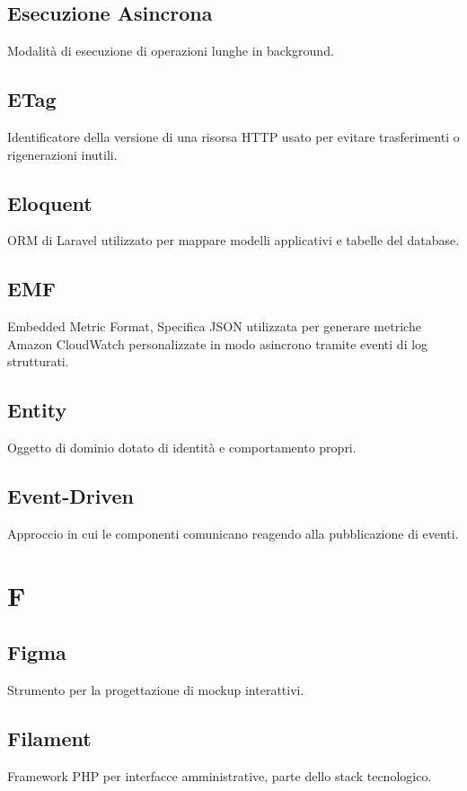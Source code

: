 \documentclass[a4paper,12pt]{article}
\begin{document}
\subsection{Esecuzione Asincrona}
Modalità di esecuzione di operazioni lunghe in background.

\subsection{ETag}
Identificatore della versione di una risorsa HTTP usato per evitare trasferimenti o rigenerazioni inutili.

\subsection{Eloquent}
ORM di Laravel utilizzato per mappare modelli applicativi e tabelle del database.

\subsection{EMF}
Embedded Metric Format, Specifica JSON utilizzata per generare metriche Amazon CloudWatch personalizzate in modo asincrono tramite eventi di log strutturati.

\subsection{Entity}
Oggetto di dominio dotato di identità e comportamento propri.

\subsection{Event-Driven}
Approccio in cui le componenti comunicano reagendo alla pubblicazione di eventi.

\section{F}
\subsection{Figma}
Strumento per la progettazione di mockup interattivi.

\subsection{Filament}
Framework PHP per interfacce amministrative, parte dello stack tecnologico.
\end{document}
